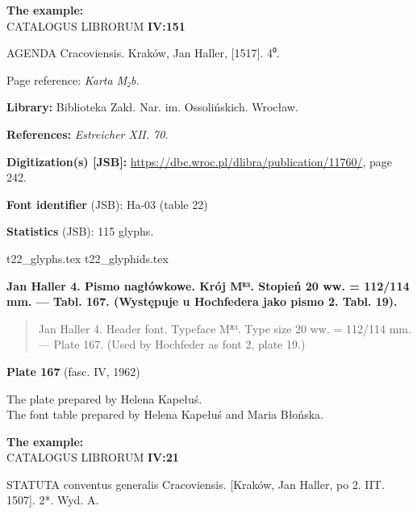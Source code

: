 \documentclass[12pt]{article}
\newcommand{\bg}{\begingl}
\newcommand{\pismoPL}[1]{{\relsize{2}\Junicode\textbf{#1}}}
\newcommand{\pismoEN}[1]{{\relsize{1}\Junicode\begin{quote}#1\end{quote}}}
\newcommand{\plate}[3]{\textbf{Plate #1} (fasc. #2, #3)}
\newcommand{\exampleBib}[1]{{\relsize{2}\Junicode\textbf{The
      example:}\\[2ex] CATALOGUS LIBRORUM \textbf{#1}}}
\newcommand{\exampleDesc}[1]{{\relsize{0}\Junicode#1}}
\newcommand{\exampleDig}[1]{{\relsize{0}\Junicode \textbf{Digitization(s) [JSB]:} #1}}
\newcommand{\exampleLib}[1]{{\relsize{0}\Junicode \textbf{Library:} #1}}
\newcommand{\examplePL}[1]{}
\newcommand{\exampleEN}[1]{}
\newcommand{\fontID}[2]{{\relsize{1}\Junicode\textbf{Font identifier} (JSB): #1 (table #2)}}
\newcommand{\fontstat}[1]{{\relsize{1}\Junicode\textbf{Statistics} (JSB): #1 glyphs.}}
\newcommand{\exampleRef}[1]{{\relsize{0}\Junicode \textbf{References:} #1}}
\newcommand{\examplePage}[1]{{Page reference: \relsize{0}\Junicode#1}}
\begin{document}
\bigskip

\exampleBib{IV:151}

\bigskip
\exampleDesc{AGENDA Cracoviensis. Kraków, Jan Haller, [1517]. 4⁰.}

\medskip
\examplePage{\textit{Karta M₂b.}}

  \bigskip
\exampleLib{Biblioteka Zakł. Nar. im. Ossolińskich. Wrocław.}

\bigskip
\exampleRef{\textit{Estreicher XII. 70.}}

\bigskip
\exampleDig{\url{https://dbc.wroc.pl/dlibra/publication/11760/}, page 242.}






\bigskip


\fontID{Ha-03}{22}

\fontstat{115}

  {t22_glyphs.tex}
  {t22_glyphids.tex}

 
  \newpage




  \pismoPL{Jan Haller 4. Pismo nagłówkowe. Krój M⁸³. Stopień 20 ww. =
    112/114 mm. — Tabl. 167. (Występuje u Hochfedera jako pismo
    2. Tabl. 19).}

  
  \pismoEN{Jan Haller 4. Header font. Typeface M⁸³. Type size 20 ww. =
    112/114 mm. — Plate 167. (Used by Hochfeder as font 2, plate 19.)}

\plate{167}{IV}{1962}

The plate prepared by Helena Kapełuś.\\
The font table prepared by Helena Kapełuś and Maria Błońska.

\bigskip

\exampleBib{IV:21}

\bigskip
\exampleDesc{STATUTA conventus generalis Cracoviensis. [Kraków, Jan Haller, po 2. IIT. 1507]. 2*. Wyd. A.}
\end{document}

